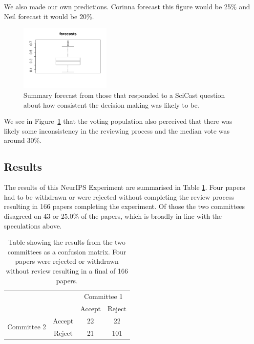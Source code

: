 \documentclass[twoside]{article}
\begin{document}
We also made our own predictions.  Corinna forecast this figure would be
25\% and Neil forecast it would be 20\%. 

\begin{figure}[htb]
\begin{center}
\includegraphics[width=0.40\textwidth]{diagrams/neurips/scicast-forecast.png}
\end{center}
\caption{Summary forecast from those that responded to a SciCast question about how consistent the decision making was likely to be.}
\label{scicast-forecast}
\end{figure}

We see in Figure~\ref{scicast-forecast} that the voting population also perceived that there was likely some inconsistency in the 
reviewing process and the median vote was around 30\%.

\subsection{Results}

The results of this NeurIPS Experiment are summarised in Table
\ref{table-neurips-experiment-results}. Four papers had to
be withdrawn or were rejected without completing the review process
resulting in 166 papers completing the experiment. Of those the two committees disagreed
on 43 or 25.0\% of the papers, which is broadly in line with the speculations above.

\begin{table}[htb]
\caption{Table showing the results from the two committees as a
  confusion matrix. Four papers were rejected or withdrawn without
  review resulting in a final of 166 papers.}
\label{table-neurips-experiment-results}
\centering
\begin{tabular}{lc|c|c|}
& & \multicolumn{2}{c}{Committee 1} \\
& & Accept & Reject \\ \hline
\multirow{2}{*}{Committee 2} & Accept & 22 & 22 \\
& Reject & 21 & 101 
\end{tabular}
\end{table}
\end{document}
